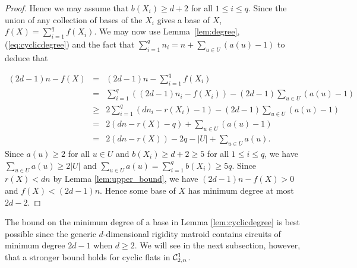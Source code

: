 \documentclass{daj}
\begin{document}
\begin{proof}
Hence we may assume that $b(X_i)\geq d+2$ for all $1\leq i\leq q$.
 Since the union of any collection of bases of the $X_i$ gives a base of $X$,  $f(X)=\sum_{i=1}^q f(X_i)$. We may now use Lemma~\ref{lem:degree},
 (\ref{eq:cyclicdegree}) and the fact that $\sum_{i=1}^qn_i=n+\sum_{u\in U}(a(u)-1)$ to deduce that


\begin{eqnarray*}
(2d-1)n-f(X)&=&(2d-1)n-\sum_{i=1}^q f(X_i)\\
&=&
\sum_{i=1}^q((2d-1)n_i- f(X_i))-(2d-1)\sum_{u\in U}(a(u)-1)\\
&\geq &2\sum_{i=1}^q (dn_i-r(X_i)-1)-(2d-1)\sum_{u\in U}(a(u)-1)\\
&= &2 (dn-r(X)-q)+\sum_{u\in U}(a(u)-1)\\
&= &2 (dn-r(X))-2q-|U|+\sum_{u\in U}a(u).
\end{eqnarray*}
Since $a(u)\geq 2$ for all $u\in U$ and $b(X_i)\geq d+2\geq 5$ for all $1\leq i\leq q$, we have $\sum_{u\in U}a(u)\geq 2|U|$
and 
$\sum_{u\in U}a(u)=\sum_{i=1}^q b(X_i)\geq 5q$. Since $r(X)<dn$ by Lemma \ref{lem:upper_bound}, we have $(2d-1)n-f(X)>0$ and $f(X)<(2d-1)n$. Hence some base of $X$ has minimum degree at most $2d-2$.
\end{proof}

The bound on the minimum degree of a base in Lemma \ref{lem:cyclicdegree} is best possible since the generic $d$-dimensional rigidity matroid contains circuits of minimum degree $2d-1$ when $d\geq 2$. We will see in the next subsection, however, that a stronger bound holds for cyclic flats in ${\cal C}^1_{2,n}$.
\end{document}
